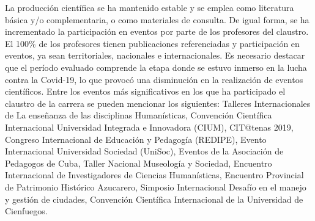 La producción científica se ha mantenido estable y se emplea como literatura básica y/o complementaria, o como materiales de consulta. De igual forma, se ha incrementado la participación en eventos por parte de los profesores del claustro. El 100\% de los profesores tienen publicaciones referenciadas y participación en eventos, ya sean territoriales, nacionales e internacionales. Es necesario destacar que el período evaluado comprende la etapa donde se estuvo inmerso en la lucha contra la Covid-19, lo que provocó una disminución en la realización de eventos científicos. Entre los eventos más significativos en los que ha participado el claustro de la carrera se pueden mencionar los siguientes: Talleres Internacionales de La enseñanza de las disciplinas Humanísticas, Convención Científica Internacional Universidad Integrada e Innovadora (CIUM), CIT@tenas 2019, Congreso Internacional de Educación y Pedagogía (REDIPE), Evento Internacional Universidad Sociedad (UniSoc), Eventos de la Asociación de Pedagogos de Cuba, Taller Nacional Museología y Sociedad, Encuentro Internacional de Investigadores de Ciencias Humanísticas, Encuentro Provincial de Patrimonio Histórico Azucarero, Simposio Internacional Desafío en el manejo y gestión de ciudades, Convención Científica Internacional de la Universidad de Cienfuegos.